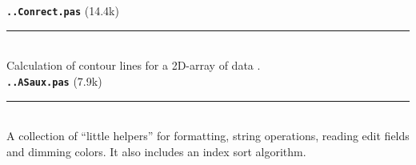 \documentclass[12pt]{article}
\newcommand\opamoduleN[2]{{\bf \tt #1} #2\\  \rule[3pt]{\textwidth}{0.2pt} \\}
\begin{document}
\opamoduleN{..Conrect.pas}{(14.4k)}
Calculation of contour lines for a 2D-array of data \cite{CONRECT}.\\

\opamoduleN{..ASaux.pas}{(7.9k)}
A collection of ``little helpers'' for formatting, string operations, reading edit fields and dimming colors. It also includes an index sort algorithm.\\

\end{document}
